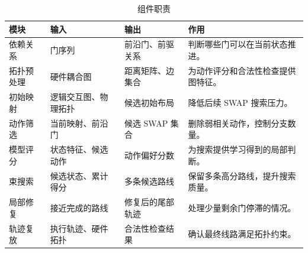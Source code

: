 \begin{table}[H]
  \centering
  \caption{组件职责}
  \label{tab:component-roles}
  \begin{tabularx}{\linewidth}{lYYY}
    \toprule
    模块 & 输入 & 输出 & 作用 \\
    \midrule
    依赖关系 & 门序列 & 前沿门、前驱关系 & 判断哪些门可以在当前状态推进。\\
    拓扑预处理 & 硬件耦合图 & 距离矩阵、边集合 & 为动作评分和合法性检查提供图特征。\\
    初始映射 & 逻辑交互图、物理拓扑 & 候选初始布局 & 降低后续 SWAP 搜索压力。\\
    动作筛选 & 当前映射、前沿门 & 候选 SWAP 集合 & 删除弱相关动作，控制分支数量。\\
    模型评分 & 状态特征、候选动作 & 动作偏好分数 & 为搜索提供学习得到的局部判断。\\
    束搜索 & 候选状态、累计得分 & 多条候选路线 & 保留多条高分路线，提升搜索质量。\\
    局部修复 & 接近完成的路线 & 修复后的尾部轨迹 & 处理少量剩余门停滞的情况。\\
    轨迹复放 & 执行轨迹、硬件拓扑 & 合法性检查结果 & 确认最终线路满足拓扑约束。\\
    \bottomrule
  \end{tabularx}
\end{table}
